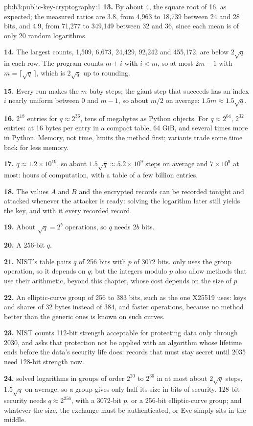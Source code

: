 \begin{solution}{pb:b3:public-key-cryptography:1}
\textbf{13.} By about 4, the square root of 16, as expected; the measured ratios are 3.8, from 4,963 to 18,739 between 24 and 28 bits, and 4.9, from 71,277 to 349,149 between 32 and 36, since each mean is of only 20 random logarithms.

\textbf{14.} The largest counts, 1,509, 6,673, 24,429, 92,242 and 455,172, are below $2\sqrt{q}$ in each row. The program counts $m + i$ with $i < m$, so at most $2m - 1$ with $m = \lceil \sqrt{q}\, \rceil$, which is $2\sqrt{q}$ up to rounding.

\textbf{15.} Every run makes the $m$ baby steps; the giant step that succeeds has an index $i$ nearly uniform between 0 and $m - 1$, so about $m/2$ on average: $1.5m \approx 1.5\sqrt{q}$.

\textbf{16.} $2^{18}$ entries for $q \approx 2^{36}$, tens of megabytes as Python objects. For $q \approx 2^{64}$, $2^{32}$ entries: at 16 bytes per entry in a compact table, 64 GiB, and several times more in Python. Memory, not time, limits the method first; variants trade some time back for less memory.

\textbf{17.} $q \approx 1.2 \times 10^{19}$, so about $1.5\sqrt{q} \approx 5.2 \times 10^9$ steps on average and $7 \times 10^9$ at most: hours of computation, with a table of a few billion entries.

\textbf{18.} The values $A$ and $B$ and the encrypted records can be recorded tonight and attacked whenever the attacker is ready: solving the logarithm later still yields the key, and with it every recorded record.

\textbf{19.} About $\sqrt{q} = 2^{b}$ operations, so $q$ needs $2b$ bits.

\textbf{20.} A 256-bit $q$.

\textbf{21.} NIST's table pairs $q$ of 256 bits with $p$ of 3072 bits.  only uses the group operation, so it depends on $q$; but the integers modulo $p$ also allow methods that use their arithmetic, beyond this chapter, whose cost depends on the size of $p$.

\textbf{22.} An elliptic-curve group of 256 to 383 bits, such as the one X25519 uses: keys and shares of 32 bytes instead of 384, and faster operations, because no method better than the generic ones is known on such curves.

\textbf{23.} NIST counts 112-bit strength acceptable for protecting data only through 2030, and asks that protection not be applied with an algorithm whose lifetime ends before the data's security life does: records that must stay secret until 2035 need 128-bit strength now.

\textbf{24.}  solved logarithms in groups of order $2^{20}$ to $2^{36}$ in at most about $2\sqrt{q}$ steps, $1.5\sqrt{q}$ on average, so a group gives only half its size in bits of security. 128-bit security needs $q \approx 2^{256}$, with a 3072-bit $p$, or a 256-bit elliptic-curve group; and whatever the size, the exchange must be authenticated, or Eve simply sits in the middle.
\end{solution}
